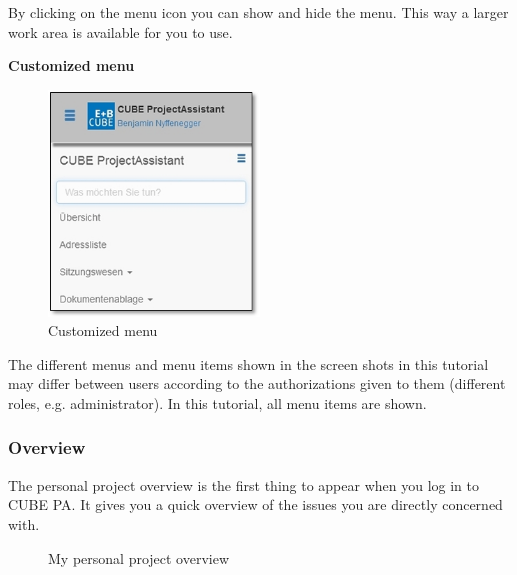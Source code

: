By clicking on the menu icon  you can show and hide the menu. This way a larger work area is available for you to use. \\

\vspace{6.5cm}  

\textbf{Customized menu}

\begin{figure}
\vspace{-35pt}
\includegraphics[height=60mm]{../chapters/01_Einfuehrung/pictures/1-3-1_MenuAngepasst.jpg}
\caption{Customized menu}
\end{figure}

The different menus and menu items shown in the screen shots in this tutorial may differ between users according to the authorizations given to them (different roles, e.g. administrator). In this tutorial, all menu items are shown.

\subsubsection{Overview}
\label{bkm:Ref132000001}
The personal project overview is the first thing to appear when you log in to CUBE PA. It gives you a quick overview of the issues you are directly concerned with.

\begin{figure}[H] %
\caption{My personal project overview}
\end{figure}

